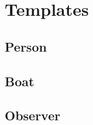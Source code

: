 \chapter{Templates}
\section{Person}





















\section{Boat}

























\section{Observer}